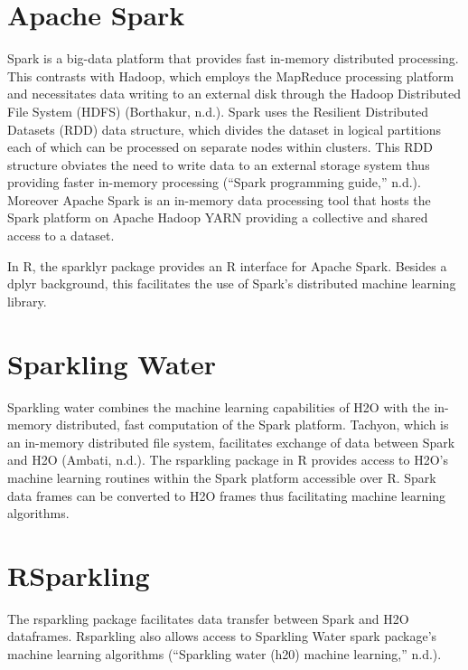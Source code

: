 \documentclass[12pt,twoside]{amherstthesis}
\begin{document}
  \section{Apache Spark}\label{apache-spark}
  
  Spark is a big-data platform that provides fast in-memory distributed
  processing. This contrasts with Hadoop, which employs the MapReduce
  processing platform and necessitates data writing to an external disk
  through the Hadoop Distributed File System (HDFS) (Borthakur, n.d.).
  Spark uses the Resilient Distributed Datasets (RDD) data structure,
  which divides the dataset in logical partitions each of which can be
  processed on separate nodes within clusters. This RDD structure obviates
  the need to write data to an external storage system thus providing
  faster in-memory processing (``Spark programming guide,'' n.d.).
  Moreover Apache Spark is an in-memory data processing tool that hosts
  the Spark platform on Apache Hadoop YARN providing a collective and
  shared access to a dataset.
  
  In R, the sparklyr package provides an R interface for Apache Spark.
  Besides a dplyr background, this facilitates the use of Spark's
  distributed machine learning library.
  
  \section{Sparkling Water}\label{sparkling-water}
  
  Sparkling water combines the machine learning capabilities of H2O with
  the in-memory distributed, fast computation of the Spark platform.
  Tachyon, which is an in-memory distributed file system, facilitates
  exchange of data between Spark and H2O (Ambati, n.d.). The rsparkling
  package in R provides access to H2O's machine learning routines within
  the Spark platform accessible over R. Spark data frames can be converted
  to H2O frames thus facilitating machine learning algorithms.
  
  \section{RSparkling}\label{rsparkling}
  
  The rsparkling package facilitates data transfer between Spark and H2O
  dataframes. Rsparkling also allows access to Sparkling Water spark
  package's machine learning algorithms (``Sparkling water (h20) machine
  learning,'' n.d.).
  
\end{document}
